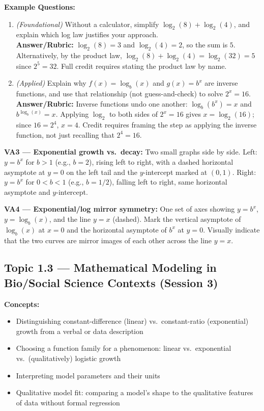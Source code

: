 \documentclass{article}
\begin{document}
\textbf{Example Questions:}
\begin{enumerate}[leftmargin=*]
  \item \textit{(Foundational)} Without a calculator, simplify $\log_2(8)+\log_2(4)$, and explain which log law justifies your approach. \\
  \textbf{Answer/Rubric:} $\log_2(8)=3$ and $\log_2(4)=2$, so the sum is $5$. Alternatively, by the product law, $\log_2(8)+\log_2(4)=\log_2(32)=5$ since $2^5=32$. Full credit requires stating the product law by name.
  \item \textit{(Applied)} Explain why $f(x)=\log_b(x)$ and $g(x)=b^x$ are inverse functions, and use that relationship (not guess-and-check) to solve $2^x=16$. \\
  \textbf{Answer/Rubric:} Inverse functions undo one another: $\log_b(b^x)=x$ and $b^{\log_b(x)}=x$. Applying $\log_2$ to both sides of $2^x=16$ gives $x=\log_2(16)$; since $16=2^4$, $x=4$. Credit requires framing the step as applying the inverse function, not just recalling that $2^4=16$.
\end{enumerate}

\begin{instrnote}
\textbf{VA3 --- Exponential growth vs.\ decay:} Two small graphs side by side. Left: $y=b^x$ for $b>1$ (e.g., $b=2$), rising left to right, with a dashed horizontal asymptote at $y=0$ on the left tail and the $y$-intercept marked at $(0,1)$. Right: $y=b^x$ for $0<b<1$ (e.g., $b=1/2$), falling left to right, same horizontal asymptote and $y$-intercept.

\textbf{VA4 --- Exponential/log mirror symmetry:} One set of axes showing $y=b^x$, $y=\log_b(x)$, and the line $y=x$ (dashed). Mark the vertical asymptote of $\log_b(x)$ at $x=0$ and the horizontal asymptote of $b^x$ at $y=0$. Visually indicate that the two curves are mirror images of each other across the line $y=x$.
\end{instrnote}

\subsection{Topic 1.3 --- Mathematical Modeling in Bio/Social Science Contexts (Session 3)}

\textbf{Concepts:}
\begin{itemize}[leftmargin=*]
  \item Distinguishing constant-difference (linear) vs.\ constant-ratio (exponential) growth from a verbal or data description
  \item Choosing a function family for a phenomenon: linear vs.\ exponential vs.\ (qualitatively) logistic growth
  \item Interpreting model parameters and their units
  \item Qualitative model fit: comparing a model's shape to the qualitative features of data without formal regression
\end{itemize}
\end{document}
